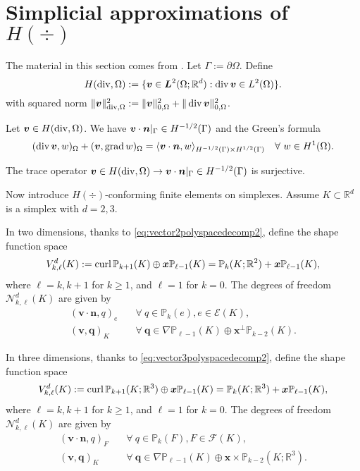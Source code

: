 \section{Simplicial approximations of $H(\div)$}
The material in this section comes from \cite{BoffiBrezziFortin2013}.
Let $\Gamma:=\partial\Omega$.
Define
\[
H(\operatorname{div},\Omega):=\{\boldsymbol v\in \boldsymbol L^2(\Omega;\mathbb R^d): \operatorname{div}\boldsymbol v\in L^2(\Omega)\}.
\]
with squared  norm $\|\boldsymbol v\|_{\operatorname{div}, \Omega}^2:=\|\boldsymbol v\|_{0, \Omega}^2+\|\operatorname{div}\boldsymbol v\|_{0, \Omega}^2$.
\begin{lemma}
Let $\boldsymbol v\in H(\operatorname{div},\Omega)$. We have $\boldsymbol v\cdot\boldsymbol n|_{\Gamma}\in H^{-1/2}(\Gamma)$ and the Green's formula
\[
(\operatorname{div}\boldsymbol v, w)_{\Omega} + (\boldsymbol v, \operatorname{grad} w)_{\Omega}=\langle\boldsymbol v\cdot\boldsymbol n, w\rangle_{H^{-1/2}(\Gamma)\times H^{1/2}(\Gamma)}\quad\forall~w\in H^1(\Omega).
\]
\end{lemma}

\begin{lemma}
The trace operator $\boldsymbol v\in H(\operatorname{div},\Omega)\to\boldsymbol v\cdot\boldsymbol n|_{\Gamma}\in H^{-1/2}(\Gamma)$ is surjective.
\end{lemma}

Now introduce $H(\div)$-conforming finite elements on simplexes.
Assume $K\subset \mathbb R^d$ is a simplex with $d=2,3$. 

In two dimensions,
thanks to \eqref{eq:vector2polyspacedecomp2}, define the shape function space
\[
V_{k,\ell}^d(K):=\operatorname{curl}\mathbb P_{k+1}(K)\oplus \boldsymbol x\mathbb P_{\ell-1}(K)=\mathbb P_{k}(K; \mathbb R^2) + \boldsymbol x\mathbb P_{\ell-1}(K),
\]
where $\ell=k, k+1$ for $k\geq1$, and $\ell=1$ for $k=0$. 
The degrees of freedom $\mathcal N_{k,\ell}^d(K)$ are given by
\begin{align}
(\boldsymbol v\cdot\boldsymbol  n, q)_e & \quad\forall~q\in\mathbb P_{k}(e),  e\in\mathcal E(K),\label{Hdivfem2ddof1}\\
(\boldsymbol v, \boldsymbol q)_K & \quad\forall~\boldsymbol q\in\nabla\mathbb P_{\ell-1}(K)\oplus\boldsymbol x^{\perp}\mathbb P_{k-2}(K). \label{Hdivfem2ddof2}
\end{align}


In three dimensions,
thanks to \eqref{eq:vector3polyspacedecomp2}, define the shape function space
\[
V_{k,\ell}^d(K):=\operatorname{curl}\mathbb P_{k+1}(K;\mathbb R^3)\oplus \boldsymbol x\mathbb P_{\ell-1}(K)=\mathbb P_{k}(K; \mathbb R^3) + \boldsymbol x\mathbb P_{\ell-1}(K),
\]
where $\ell=k, k+1$ for $k\geq1$, and $\ell=1$ for $k=0$. 
The degrees of freedom $\mathcal N_{k,\ell}^d(K)$ are given by
\begin{align}
(\boldsymbol v\cdot\boldsymbol  n, q)_F & \quad\forall~q\in\mathbb P_{k}(F),  F\in\mathcal F(K),\label{Hdivfem3ddof1}\\
(\boldsymbol v, \boldsymbol q)_K & \quad\forall~\boldsymbol q\in\nabla\mathbb P_{\ell-1}(K)\oplus\boldsymbol x\times\mathbb P_{k-2}(K; \mathbb R^3). \label{Hdivfem3ddof2}
\end{align}

